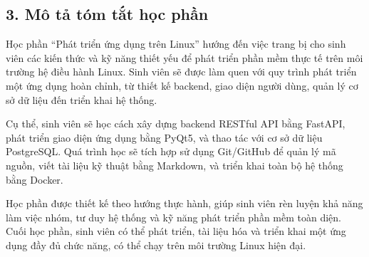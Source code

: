 \subsection*{3. Mô tả tóm tắt học phần}
\hspace{1cm}Học phần “Phát triển ứng dụng trên Linux” hướng đến việc trang bị cho sinh viên các kiến thức và kỹ năng thiết yếu để phát triển phần mềm thực tế trên môi trường hệ điều hành Linux. Sinh viên sẽ được làm quen với quy trình phát triển một ứng dụng hoàn chỉnh, từ thiết kế backend, giao diện người dùng, quản lý cơ sở dữ liệu đến triển khai hệ thống.

\hspace{1cm}Cụ thể, sinh viên sẽ học cách xây dựng backend RESTful API bằng FastAPI, phát triển giao diện ứng dụng bằng PyQt5, và thao tác với cơ sở dữ liệu PostgreSQL. Quá trình học sẽ tích hợp sử dụng Git/GitHub để quản lý mã nguồn, viết tài liệu kỹ thuật bằng Markdown, và triển khai toàn bộ hệ thống bằng Docker.

\hspace{1cm}Học phần được thiết kế theo hướng thực hành, giúp sinh viên rèn luyện khả năng làm việc nhóm, tư duy hệ thống và kỹ năng phát triển phần mềm toàn diện. Cuối học phần, sinh viên có thể phát triển, tài liệu hóa và triển khai một ứng dụng đầy đủ chức năng, có thể chạy trên môi trường Linux hiện đại.

